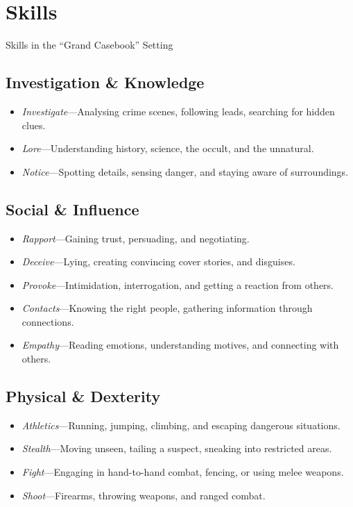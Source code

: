 
\section{Skills}
\label{core:skills}

\begin{WyrdExampleSidebar}[float=!t]{Skills in the ``Grand Casebook'' Setting}
	\subsection*{Investigation \& Knowledge}  
	\begin{itemize}
    	\item \emph{Investigate}---Analysing crime scenes, following leads, searching for hidden clues.
	    \item \emph{Lore}---Understanding history, science, the occult, and the unnatural.
	    \item \emph{Notice}---Spotting details, sensing danger, and staying aware of surroundings.
	\end{itemize}

	\subsection*{Social \& Influence}  
	\begin{itemize}
    	\item \emph{Rapport}---Gaining trust, persuading, and negotiating.
	    \item \emph{Deceive}---Lying, creating convincing cover stories, and disguises.
    	\item \emph{Provoke}---Intimidation, interrogation, and getting a reaction from others.
	    \item \emph{Contacts}---Knowing the right people, gathering information through connections.
		\item \emph{Empathy}---Reading emotions, understanding motives, and connecting with others.
	\end{itemize}

	\subsection*{Physical \& Dexterity}  
	\begin{itemize}
    	\item \emph{Athletics}---Running, jumping, climbing, and escaping dangerous situations.
	    \item \emph{Stealth}---Moving unseen, tailing a suspect, sneaking into restricted areas.
	    \item \emph{Fight}---Engaging in hand-to-hand combat, fencing, or using melee weapons.
	    \item \emph{Shoot}---Firearms, throwing weapons, and ranged combat.
	\end{itemize}


\end{WyrdExampleSidebar}
